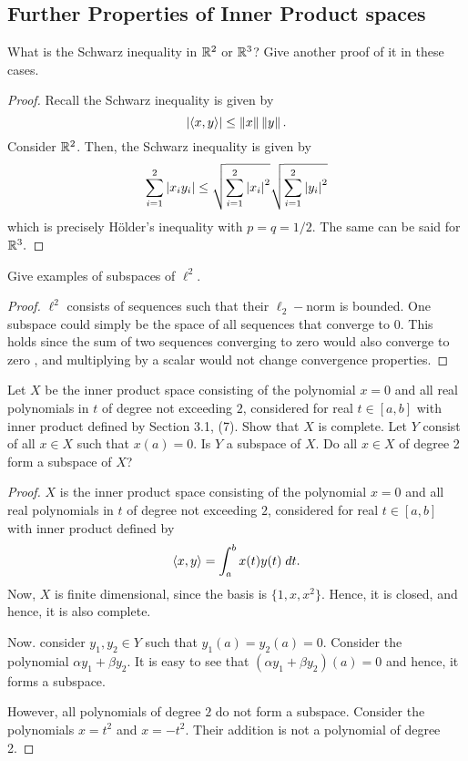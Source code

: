 \subsection{Further Properties of Inner Product spaces}

\begin{question}
    What is the Schwarz inequality in $\mathbb{R}^2$ or $\mathbb{R}^3$? Give another proof of it in these cases.
    \label{section3.2-1}
\end{question}
\begin{proof}
    Recall the Schwarz inequality is given by
    \[\left\lvert \left\langle x , y \right\rangle \right\rvert \leq \left\lVert x \right\rVert \left\lVert y \right\rVert.\]
    Consider $\mathbb{R}^2$. Then, the Schwarz inequality is given by
    \[\sum_{i=1}^2 \left\lvert x_i y_i \right\rvert \leq \sqrt{\sum_{i=1}^2 \left\lvert x_i \right\rvert^2 } \sqrt{\sum_{i=1}^2 \left\lvert y_i \right\rvert^2}\]
    which is precisely Hölder's inequality with $p = q  = 1/2$. The same can be said for $\mathbb{R}^3.$
\end{proof}

\begin{question}
    Give examples of subspaces of $\ell^2$.
    \label{section3.2-2}
\end{question}
\begin{proof}
    $\ell^2$ consists of sequences such that their $\ell_2-$norm is bounded. One subspace could simply be the space of all sequences that converge to $0$. This holds since the sum of two sequences converging to zero would also converge to zero , and multiplying by a scalar would not change convergence properties.
\end{proof}

\begin{question}
    Let $X$ be the inner product space consisting of the polynomial $x = 0$ and all real polynomials in $t$ of degree not exceeding $2$, considered for real $t \in [a,b]$ with inner product defined by Section 3.1, (7). Show that $X$ is complete. Let $Y$ consist of all $x \in X$ such that $x(a) = 0$. Is $Y$ a subspace of $X$. Do all $x \in X$ of degree 2 form a subspace of $X$?
    \label{section3.2-3}
\end{question}
\begin{proof}
    $X$ is the inner product space consisting of the polynomial $x = 0$ and all real polynomials in $t$ of degree not exceeding $2$, considered for real $t \in [a,b]$ with inner product defined by 
    \[\left\langle x , y \right\rangle = \int_a^{b} x(t) y(t) \; dt.\]
    Now, $X$ is finite dimensional, since the basis is $\{1 , x , x^2\}$. Hence, it is closed, and hence, it is also complete. 

    Now. consider $y_1 , y_2 \in Y$ such that $y_1(a) = y_2(a) = 0$. Consider the polynomial $\alpha y_1 + \beta y_2$. It is easy to see that $(\alpha y_1 + \beta y_2)(a) = 0$ and hence, it forms a subspace.

    However, all polynomials of degree $2$ do not form a subspace. Consider the polynomials $x = t^2$ and $x = -t^2$. Their addition is not a polynomial of degree 2.
\end{proof}

